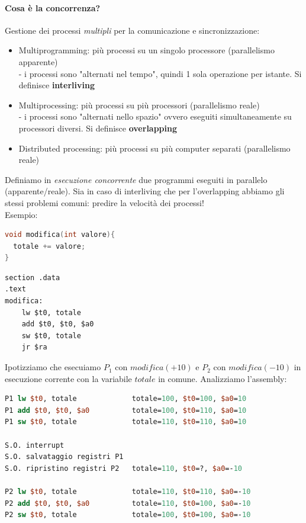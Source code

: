 \documentclass[a4paper,12pt]{article}
\begin{document}
\paragraph{Cosa è la concorrenza?\\} 
Gestione dei processi \textit{multipli} per la comunicazione e sincronizzazione:
\begin{itemize}
  \item Multiprogramming: più processi su un singolo processore (parallelismo apparente) \\
  - i processi sono "alternati nel tempo", quindi 1 sola operazione per istante. Si definisce \textbf{interliving}
  \item Multiprocessing: più processi su più processori (parallelismo reale) \\
  - i processi sono "alternati nello spazio" ovvero eseguiti simultaneamente su processori diversi. Si definisce \textbf{overlapping}
  \item Distributed processing: più processi su più computer separati (parallelismo reale)
\end{itemize}
Definiamo in \textit{esecuzione concorrente} due programmi eseguiti in parallelo (apparente/reale). Sia in caso di interliving che per l'overlapping abbiamo gli stessi problemi comuni: predire la velocità dei processi! \\
Esempio: \\
\begin{minipage}{0.48\textwidth}
\begin{lstlisting}[language=C]
void modifica(int valore){
  totale += valore;
}
\end{lstlisting}
\end{minipage}
\hfill
\begin{minipage}{0.48\textwidth}
\begin{lstlisting}[language={[x86masm]Assembler}]
section .data
.text
modifica:
    lw $t0, totale
    add $t0, $t0, $a0
    sw $t0, totale
    jr $ra
\end{lstlisting}
\end{minipage}
Ipotizziamo che esecuiamo $P_1$ con $modifica(+10)$ e $P_2$ con $modifica(-10)$ in esecuzione corrente con la variabile $totale$ in comune. Analizziamo l'assembly:
\begin{lstlisting}[language=MIPS]
P1 lw $t0, totale             totale=100, $t0=100, $a0=10
P1 add $t0, $t0, $a0          totale=100, $t0=110, $a0=10
P1 sw $t0, totale             totale=110, $t0=110, $a0=10

S.O. interrupt
S.O. salvataggio registri P1
S.O. ripristino registri P2   totale=110, $t0=?, $a0=-10

P2 lw $t0, totale             totale=110, $t0=110, $a0=-10
P2 add $t0, $t0, $a0          totale=110, $t0=100, $a0=-10
P2 sw $t0, totale             totale=100, $t0=100, $a0=-10
\end{lstlisting}
\end{document}
